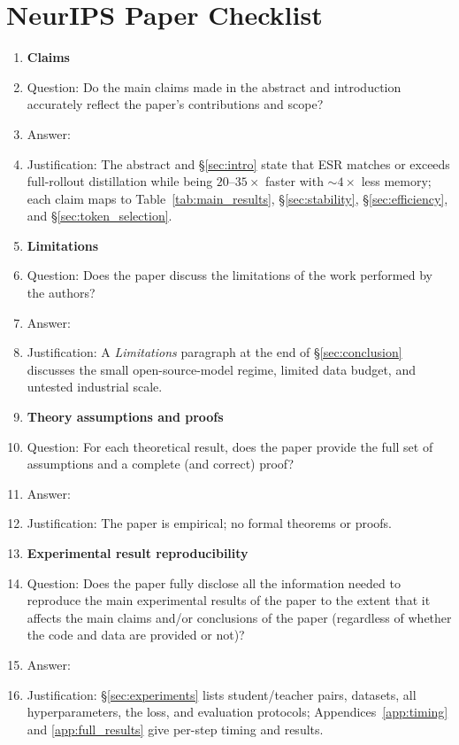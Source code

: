 \section*{NeurIPS Paper Checklist}

\begin{enumerate}

\item {\bf Claims}
    \item[] Question: Do the main claims made in the abstract and introduction accurately reflect the paper's contributions and scope?
    \item[] Answer: \answerYes{}
    \item[] Justification: The abstract and \S\ref{sec:intro} state that ESR matches or exceeds full-rollout distillation while being $20$--$35\times$ faster with $\sim 4\times$ less memory; each claim maps to Table~\ref{tab:main_results}, \S\ref{sec:stability}, \S\ref{sec:efficiency}, and \S\ref{sec:token_selection}.

\item {\bf Limitations}
    \item[] Question: Does the paper discuss the limitations of the work performed by the authors?
    \item[] Answer: \answerYes{}
    \item[] Justification: A \emph{Limitations} paragraph at the end of \S\ref{sec:conclusion} discusses the small open-source-model regime, limited data budget, and untested industrial scale.

\item {\bf Theory assumptions and proofs}
    \item[] Question: For each theoretical result, does the paper provide the full set of assumptions and a complete (and correct) proof?
    \item[] Answer: \answerNA{}
    \item[] Justification: The paper is empirical; no formal theorems or proofs.

    \item {\bf Experimental result reproducibility}
    \item[] Question: Does the paper fully disclose all the information needed to reproduce the main experimental results of the paper to the extent that it affects the main claims and/or conclusions of the paper (regardless of whether the code and data are provided or not)?
    \item[] Answer: \answerYes{}
    \item[] Justification: \S\ref{sec:experiments} lists student/teacher pairs, datasets, all hyperparameters, the loss, and evaluation protocols; Appendices~\ref{app:timing} and \ref{app:full_results} give per-step timing and results.



\end{enumerate}
